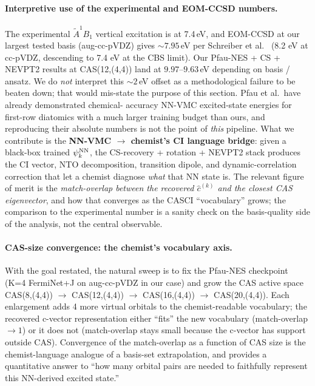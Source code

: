 \documentclass[journal=jctcce,manuscript=suppinfo,layout=traditional]{achemso}
\begin{document}
\paragraph{Interpretive use of the experimental and EOM-CCSD numbers.}
The experimental $\tilde A^1 B_1$ vertical excitation is at 7.4\,eV,
and EOM-CCSD at our largest tested basis (aug-cc-pVDZ) gives
$\sim 7.95$\,eV per Schreiber et al.~\cite{schreiber2008benchmarks}
(8.2 eV at cc-pVDZ, descending to 7.4 eV at the CBS limit).
Our Pfau-NES + CS + NEVPT2 results at CAS(12,(4,4)) land at
$9.97$--$9.63$\,eV depending on basis / ansatz. We do
\emph{not} interpret this $\sim 2$\,eV offset as a methodological
failure to be beaten down; that would mis-state the purpose of
this section. Pfau et al.\ have already demonstrated chemical-
accuracy NN-VMC excited-state energies for first-row diatomics
with a much larger training budget than ours, and reproducing
their absolute numbers is not the point of \emph{this} pipeline.
What we contribute is the \textbf{NN-VMC $\to$ chemist's CI
language bridge}: given a black-box trained $\psi_k^{\rm NN}$, the
CS-recovery + rotation + NEVPT2 stack produces the CI vector, NTO
decomposition, transition dipole, and dynamic-correlation
correction that let a chemist diagnose \emph{what} that NN state
is. The relevant figure of merit is the
\emph{match-overlap between the recovered $\widehat c^{(k)}$ and
the closest CAS eigenvector}, and how that converges as the
CASCI ``vocabulary'' grows; the comparison to the experimental
number is a sanity check on the basis-quality side of the analysis,
not the central observable.

\paragraph{CAS-size convergence: the chemist's vocabulary axis.}
\label{sec:cas_vocab_convergence}
With the goal restated, the natural sweep is to fix the
Pfau-NES checkpoint (K=4 FermiNet+J on aug-cc-pVDZ in our case)
and grow the CAS active space CAS(8,(4,4)) $\to$ CAS(12,(4,4)) $\to$
CAS(16,(4,4)) $\to$ CAS(20,(4,4)). Each enlargement adds 4 more
virtual orbitals to the chemist-readable vocabulary; the
recovered c-vector representation either ``fits'' the new
vocabulary (match-overlap $\to 1$) or it does not (match-overlap
stays small because the c-vector has support outside CAS).
Convergence of the match-overlap as a function of CAS size is
the chemist-language analogue of a basis-set extrapolation, and
provides a quantitative answer to ``how many orbital pairs are
needed to faithfully represent this NN-derived excited state.''
\end{document}
